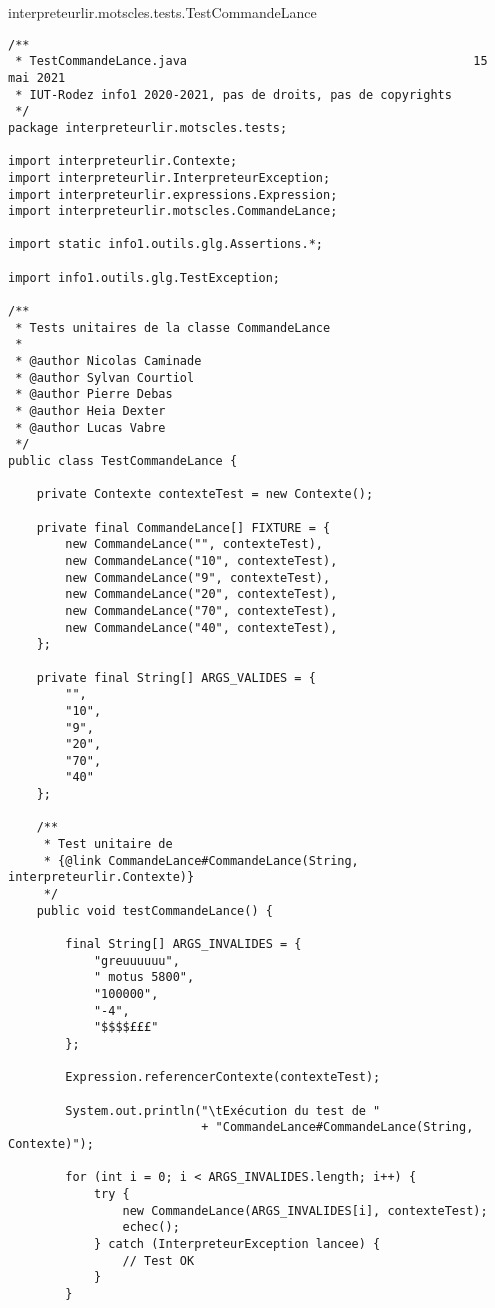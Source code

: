 \begin{enum}
    \item interpreteurlir.motscles.tests.TestCommandeLance
\begin{verbatim}
/**
 * TestCommandeLance.java                                        15 mai 2021
 * IUT-Rodez info1 2020-2021, pas de droits, pas de copyrights
 */
package interpreteurlir.motscles.tests;

import interpreteurlir.Contexte;
import interpreteurlir.InterpreteurException;
import interpreteurlir.expressions.Expression;
import interpreteurlir.motscles.CommandeLance;

import static info1.outils.glg.Assertions.*;

import info1.outils.glg.TestException;

/** 
 * Tests unitaires de la classe CommandeLance
 * 
 * @author Nicolas Caminade
 * @author Sylvan Courtiol
 * @author Pierre Debas
 * @author Heia Dexter
 * @author Lucas Vabre
 */
public class TestCommandeLance {
    
    private Contexte contexteTest = new Contexte();
    
    private final CommandeLance[] FIXTURE = {
        new CommandeLance("", contexteTest),
        new CommandeLance("10", contexteTest),
        new CommandeLance("9", contexteTest),
        new CommandeLance("20", contexteTest),
        new CommandeLance("70", contexteTest),
        new CommandeLance("40", contexteTest),
    };
    
    private final String[] ARGS_VALIDES = {
        "",
        "10",
        "9",
        "20",
        "70",
        "40"
    };    

    /** 
     * Test unitaire de 
     * {@link CommandeLance#CommandeLance(String, interpreteurlir.Contexte)}
     */
    public void testCommandeLance() {
        
        final String[] ARGS_INVALIDES = {
            "greuuuuuu",
            " motus 5800",
            "100000",
            "-4",
            "$$$$£££"
        };
        
        Expression.referencerContexte(contexteTest);
        
        System.out.println("\tExécution du test de "
                           + "CommandeLance#CommandeLance(String, Contexte)");
        
        for (int i = 0; i < ARGS_INVALIDES.length; i++) {
            try {
                new CommandeLance(ARGS_INVALIDES[i], contexteTest);
                echec();
            } catch (InterpreteurException lancee) {
                // Test OK
            }
        }
        

\end{verbatim}
\end{enum}
